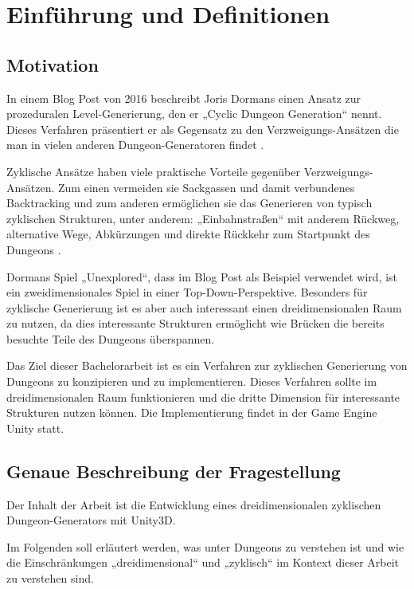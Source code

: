 \chapter{Einführung und Definitionen}

\section{Motivation}

In einem Blog Post von 2016 beschreibt Joris Dormans einen Ansatz zur prozeduralen Level-Generierung, den er „Cyclic Dungeon Generation“ nennt. Dieses Verfahren präsentiert er als Gegensatz zu den Verzweigungs-Ansätzen die man in vielen anderen Dungeon-Generatoren findet \cite{blogCyclic}.

Zyklische Ansätze haben viele praktische Vorteile gegenüber Verzweigungs-Ansätzen. Zum einen vermeiden sie Sackgassen und damit verbundenes Backtracking und zum anderen ermöglichen sie das Generieren von typisch zyklischen Strukturen, unter anderem: „Einbahnstraßen“ mit anderem Rückweg, alternative Wege, Abkürzungen und direkte Rückkehr zum Startpunkt des Dungeons 
\cite{blogCyclic}.

Dormans Spiel „Unexplored“, dass im Blog Post als Beispiel verwendet wird, ist ein zweidimensionales Spiel in einer Top-Down-Perspektive. Besonders für zyklische Generierung ist es aber auch interessant einen dreidimensionalen Raum zu nutzen, da dies interessante Strukturen ermöglicht wie Brücken die bereits besuchte Teile des Dungeons überspannen.  

Das Ziel dieser Bachelorarbeit ist es ein Verfahren zur zyklischen Generierung von Dungeons zu konzipieren und zu implementieren. Dieses Verfahren sollte im dreidimensionalen Raum funktionieren und die dritte Dimension für interessante Strukturen nutzen können. Die Implementierung findet in der Game Engine Unity statt.

\section{Genaue Beschreibung der Fragestellung}

Der Inhalt der Arbeit ist die Entwicklung eines dreidimensionalen zyklischen Dungeon-Generators mit Unity3D. 

Im Folgenden soll erläutert werden, was unter Dungeons zu verstehen ist und wie die Einschränkungen „dreidimensional“ und „zyklisch“ im Kontext dieser Arbeit zu verstehen sind.

